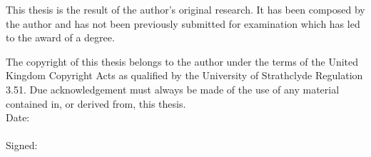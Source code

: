 \begin{ccopyright}      

This thesis is the result of the author's original research. It has been composed by the author and has not been previously submitted for examination which has led to the award of a degree.

The copyright of this thesis belongs to the author under the terms of the United Kingdom Copyright Acts as qualified by the University of Strathclyde Regulation 3.51. Due acknowledgement must always be made of the use of any material contained in, or derived from, this thesis. \\

Date:     \\ \\
Signed:

\end{ccopyright}



